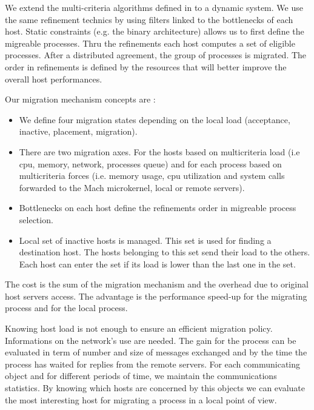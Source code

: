 We extend the multi-criteria algorithms defined in \cite {folliot:these} to a dynamic system. 
We use the same refinement technics by using filters linked to the bottlenecks of each host. 
Static constraints (e.g. the binary architecture) allows us to first define the migreable processes. Thru 
the refinements each host computes a set of eligible processes. After a distributed agreement, the group of processes is migrated.
The order in refinements is defined by the resources that will better improve the overall host performances.

	Our migration mechanism concepts are :
\begin{itemize}
        \item We define four migration states depending on the local load (acceptance, inactive, placement, migration).
        \item There are two migration axes. For the hosts based on multicriteria load (i.e cpu, memory, network, processes queue)
 and for each process based on multicriteria forces (i.e. memory usage, cpu utilization and system calls forwarded to the Mach microkernel, 
local or remote servers).
        \item Bottlenecks on each host define the refinements order in migreable process selection.
        \item Local set of inactive hosts is managed. This set is used for finding a destination host. 
The hosts belonging to this set send their load to the others. Each host can enter the set if its load is lower than the last one in the set. 
\end{itemize}

The cost is the sum of the migration mechanism and the overhead due to original host servers access.
The advantage is the performance speed-up for the migrating process and for the local process. 

Knowing host load is not enough to ensure an efficient migration policy. Informations on the network's 
use are needed\cite {dejan93}. The gain for the process can be evaluated in term of number and size of messages exchanged and by the
time the process has waited for replies from the remote servers. 
For each communicating object and for different periods of time, we maintain the communications statistics.
By knowing which hosts are concerned by this objects we can evaluate the most interesting host for
migrating a process in a local point of view.

